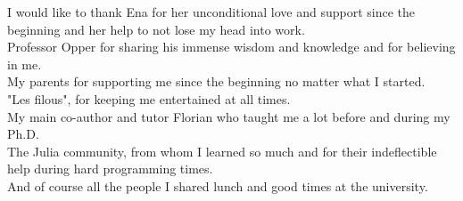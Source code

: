 

\begin{acknowledgements}      %

I would like to thank Ena for her unconditional love and support since the beginning and her help to not lose my head into work.\\
Professor Opper for sharing his immense wisdom and knowledge and for believing in me.\\
My parents for supporting me since the beginning no matter what I started.\\
"Les filous", for keeping me entertained at all times.\\
My main co-author and tutor Florian who taught me a lot before and during my Ph.D.\\
The Julia community, from whom I learned so much and for their indeflectible help during hard programming times.\\
And of course all the people I shared lunch and good times at the university.


\end{acknowledgements}



